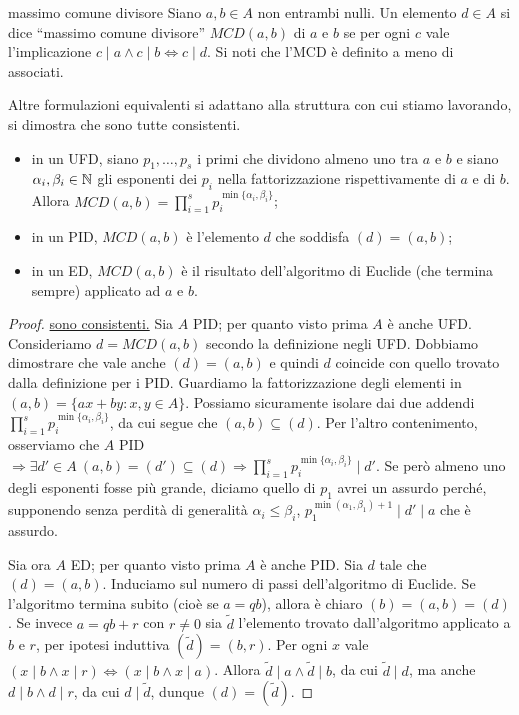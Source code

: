 \begin{definition}{massimo comune divisore}
    Siano $a, b \in A$ non entrambi nulli. Un elemento $d \in A$ si dice ``massimo comune divisore'' $MCD(a, b)$ di $a$ e $b$ se per ogni $c$ vale l'implicazione $c \mid a \land c \mid b \iff c \mid d$. Si noti che l'MCD è definito a meno di associati.

    Altre formulazioni equivalenti si adattano alla struttura con cui stiamo lavorando, si dimostra che sono tutte consistenti.
    \begin{itemize}
        \item in un UFD, siano $p_1,\dots,p_s$ i primi che dividono almeno uno tra $a$ e $b$ e siano $\alpha_i, \beta_i \in \mathbb{N}$ gli esponenti dei $p_i$ nella fattorizzazione rispettivamente di $a$ e di $b$. Allora $MCD(a,b) = \prod_{i=1}^s p_i^{\min \{ \alpha_i,\beta_i \} }$;
        \item in un PID, $MCD(a,b)$ è l'elemento $d$ che soddisfa $(d) = (a,b)$;
        \item in un ED, $MCD(a,b)$ è il risultato dell'algoritmo di Euclide (che termina sempre) applicato ad $a$ e $b$.
    \end{itemize}
\end{definition}
\begin{proof}
    \underline{sono consistenti.} 
    Sia $A$ PID; per quanto visto prima $A$ è anche UFD. Consideriamo $d = MCD(a,b)$ secondo la definizione negli UFD. Dobbiamo dimostrare che vale anche $(d) = (a,b)$ e quindi $d$ coincide con quello trovato dalla definizione per i PID. Guardiamo la fattorizzazione degli elementi in $(a,b) = \{ax+by : x,y \in A\}$. Possiamo sicuramente isolare dai due addendi $\prod_{i=1}^s p_i^{\min\{\alpha_i,\beta_i\}}$, da cui segue che $(a,b) \subseteq (d)$. Per l'altro contenimento, osserviamo che $A$ PID $\Rightarrow \exists d' \in A \ (a,b) = (d') \subseteq (d) \Rightarrow \prod_{i=1}^s p_i^{\min\{\alpha_i,\beta_i\}}\mid d'$. Se però almeno uno degli esponenti fosse più grande, diciamo quello di $p_1$ avrei un assurdo perché, supponendo senza perdità di generalità $\alpha_i\leq \beta_i$, $p_1^{\min(\alpha_1,\beta_1)+1}\mid d'\mid a$ che è assurdo.
    
    Sia ora $A$ ED; per quanto visto prima $A$ è anche PID. Sia $d$ tale che $(d) = (a,b)$. Induciamo sul numero di passi dell'algoritmo di Euclide. Se l'algoritmo termina subito (cioè se $a = qb$), allora è chiaro $(b) = (a, b) = (d)$. Se invece $a = qb + r$ con $r \neq 0$ sia $\tilde d$ l'elemento trovato dall'algoritmo applicato a $b$ e $r$, per ipotesi induttiva $(\tilde d) = (b, r)$. Per ogni $x$ vale $(x \mid b \land x \mid r) \iff (x \mid b \land x \mid a)$. Allora $\tilde d \mid a \land \tilde d \mid b$, da cui $\tilde d \mid d$, ma anche $d \mid b \land d \mid r$, da cui $d \mid \tilde d$, dunque $(d) = (\tilde d)$.
\end{proof}
